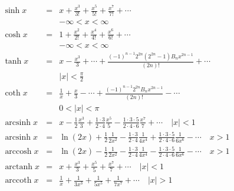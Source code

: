 \begin{eqnarray}
    \sinh x & = & x+\frac{x^3}{3!}+\frac{x^5}{5!}+\frac{x^7}{7!}+\cdots \\
    & & -\infty<x<\infty \\
    \cosh x & = & 1+\frac{x^2}{2!}+\frac{x^4}{4!}+\frac{x^6}{6!}+\cdots \\
    & & -\infty<x<\infty \\
    \tanh x & = & x-\frac{x^3}{3}+\cdots+\frac{(-1)^{n-1} 2^{2 n}\left(2^{2 n}-1\right) B_n x^{2 n-1}}{(2 n)!}+\cdots \\
    & & |x|<\frac{\pi}{2} \\
    \operatorname{coth} x & = & \frac{1}{x}+\frac{x}{3}-\cdots+\frac{(-1)^{n-1} 2^{2 n} B_n x^{2 n-1}}{(2 n)!}-\cdots \\
    & & 0<|x|<\pi \\
    \operatorname{arcsinh} x & = & x-\frac{1}{2} \frac{x^3}{3}+\frac{1 \cdot 3}{2 \cdot 4} \frac{x^5}{5}-\frac{1 \cdot 3 \cdot 5}{2 \cdot 4 \cdot 6} \frac{x^7}{7}+\cdots \quad |x|<1 \\
    \operatorname{arcsinh} x & = & \ln (2 x)+\frac{1}{2} \frac{1}{2 x^2}-\frac{1 \cdot 3}{2 \cdot 4} \frac{1}{4 x^4}+\frac{1 \cdot 3 \cdot 5}{2 \cdot 4 \cdot 6} \frac{1}{6 x^6}-\cdots \quad x>1 \\
    \operatorname{arccosh} x & = & \ln (2 x)-\frac{1}{2} \frac{1}{2 x^2}-\frac{1 \cdot 3}{2 \cdot 4} \frac{1}{4 x^4}-\frac{1 \cdot 3 \cdot 5}{2 \cdot 4 \cdot 6} \frac{1}{6 x^6}-\cdots \quad x>1 \\
    \operatorname{arctanh} x & = & x+\frac{x^3}{3}+\frac{x^5}{5}+\frac{x^7}{7}+\cdots \quad |x|<1 \\
    \operatorname{arccoth} x & = & \frac{1}{x}+\frac{1}{3 x^3}+\frac{1}{5 x^5}+\frac{1}{7 x^7}+\cdots \quad |x|>1 \\
\end{eqnarray}


